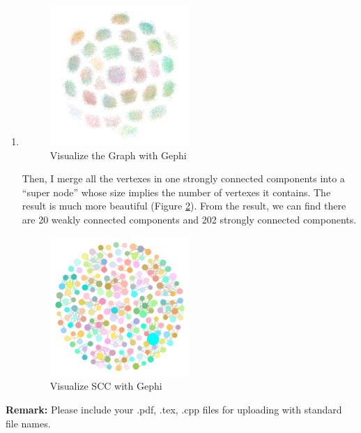 \documentclass[12pt,a4paper]{article}
\makeatletter
\newtheorem*{solution}{Solution}
\theoremstyle{definition}
\renewenvironment{solution}[1][Solution] {\par\pushQED{\qed}\normalfont\topsep6\p@\@plus6\p@\relax\trivlist\item[\hskip\labelsep\bfseries#1\@addpunct{.}]\ignorespaces}{\popQED\endtrivlist\@endpefalse} \makeatother
\makeatother
\begin{document}
\begin{enumerate}
\begin{solution}
\begin{enumerate}
        \begin{figure}[!htbp]
    	\centering
    	\includegraphics[width=0.5\textwidth]{Fig-graph.png}
    	\caption{Visualize the Graph with Gephi}
    	\label{Fig-graph}
    	\end{figure}
    	
        Then, I merge all the vertexes in one strongly connected components into a ``super node'' whose size implies the number of vertexes it contains. The result is much more beautiful (Figure \ref{Fig-SCC}). From the result, we can find there are 20 weakly connected components and 202 strongly connected components.
        \begin{figure}[!htbp]
    	\centering
    	\includegraphics[width=0.5\textwidth]{Fig-SCC.png}
    	\caption{Visualize SCC with Gephi}
    	\label{Fig-SCC}
    	\end{figure}
    	\newpage
    \end{enumerate}
    \end{solution}
    
\end{enumerate}



\textbf{Remark:} Please include your .pdf, .tex, .cpp files for uploading with standard file names.
\newpage


\end{document}
